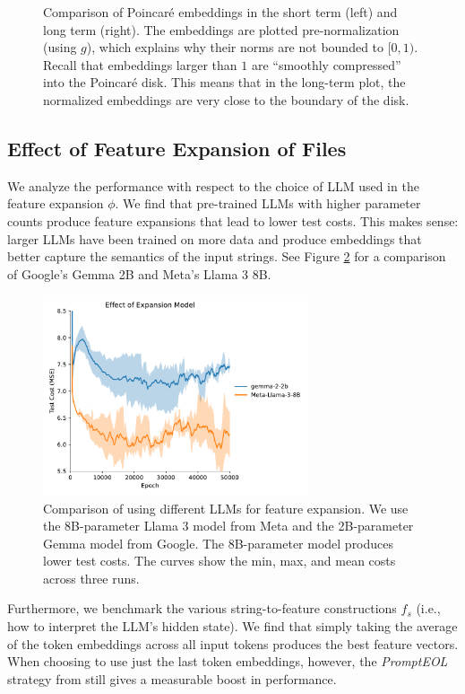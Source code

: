 \documentclass{article}
\begin{document}
\begin{figure}[ht]
\begin{minipage}{0.5\textwidth}
  \end{minipage}
  \caption{Comparison of Poincaré embeddings in the short term (left) and long term (right). The embeddings are plotted pre-normalization (using $g$), which explains why their norms are not bounded to $[0, 1)$. Recall that embeddings larger than $1$ are ``smoothly compressed'' into the Poincaré disk. This means that in the long-term plot, the normalized embeddings are very close to the boundary of the disk.}
  \label{fig:short-and-long-term-embeddings}
\end{figure}

\subsection{Effect of Feature Expansion of Files}

We analyze the performance with respect to the choice of LLM used in the feature expansion $\phi$. We find that pre-trained LLMs with higher parameter counts produce feature expansions that lead to lower test costs. This makes sense: larger LLMs have been trained on more data and produce embeddings that better capture the semantics of the input strings. See Figure \ref{fig:expansion-model} for a comparison of Google's Gemma 2B and Meta's Llama 3 8B.

\begin{figure}[ht]
  \centering
  \includegraphics[width=0.7\textwidth]{figures/expansion_model.pdf}
  \caption{Comparison of using different LLMs for feature expansion. We use the 8B-parameter Llama 3 model from Meta and the 2B-parameter Gemma model from Google. The 8B-parameter model produces lower test costs. The curves show the min, max, and mean costs across three runs.}
  \label{fig:expansion-model}
\end{figure}

Furthermore, we benchmark the various string-to-feature constructions $f_s$ (i.e., how to interpret the LLM's hidden state). We find that simply taking the average of the token embeddings across all input tokens produces the best feature vectors. When choosing to use just the last token embeddings, however, the \emph{PromptEOL} strategy from \cite{jiang2023scalingsentenceembeddingslarge} still gives a measurable boost in performance.
\end{document}
